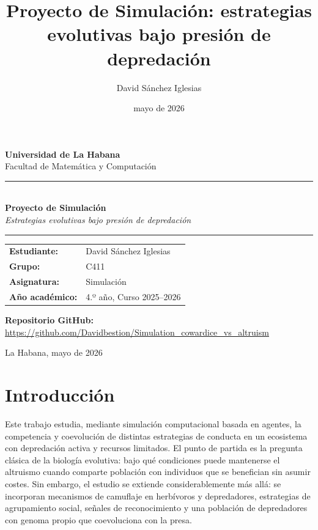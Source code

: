 \documentclass[11pt,a4paper]{article}
\title{Proyecto de Simulaci\'on: estrategias evolutivas bajo presi\'on de depredaci\'on}
\author{David S\'anchez Iglesias}
\date{mayo de 2026}
\begin{document}
\begin{titlepage}
  \centering
  \vspace*{1.5cm}

  {\Large \textbf{Universidad de La Habana}\\[0.3em]
   \large Facultad de Matemática y Computación}

  \vspace{2cm}
  \rule{\linewidth}{0.5pt}\\[0.4cm]
  {\LARGE \textbf{Proyecto de Simulaci\'on}}\\[0.3cm]
  {\large \textit{Estrategias evolutivas bajo presi\'on de depredaci\'on}}\\[0.2cm]
  \rule{\linewidth}{0.5pt}

  \vspace{1.5cm}

  \begin{tabular}{ll}
    \textbf{Estudiante:}  & {David S\'anchez Iglesias} \\[0.4em]
    \textbf{Grupo:}       & {C411} \\[0.4em]
    \textbf{Asignatura:}  & Simulación \\[0.4em]
    \textbf{Año académico:} & 4.º año, Curso 2025--2026 \\
  \end{tabular}

  \vspace{2cm}

  \textbf{Repositorio GitHub:}\\[0.3em]
  \url{https://github.com/Davidbestion/Simulation_cowardice_vs_altruism}

  \vfill
  {\small La Habana, mayo de 2026}
\end{titlepage}

\newpage

\tableofcontents
\newpage

\section{Introducci\'on}

Este trabajo estudia, mediante simulaci\'on computacional basada en agentes, la competencia y coevoluci\'on
de distintas estrategias de conducta en un ecosistema con depredaci\'on activa y recursos limitados.
El punto de partida es la pregunta cl\'asica de la biolog\'ia evolutiva: bajo qu\'e condiciones puede mantenerse
el altruismo cuando comparte poblaci\'on con individuos que se benefician sin asumir costes.
Sin embargo, el estudio se extiende considerablemente m\'as all\'a: se incorporan mecanismos de camuflaje en
herb\'ivoros y depredadores, estrategias de agrupamiento social, se\~nales de reconocimiento y una poblaci\'on
de depredadores con genoma propio que coevoluciona con la presa.
\end{document}
